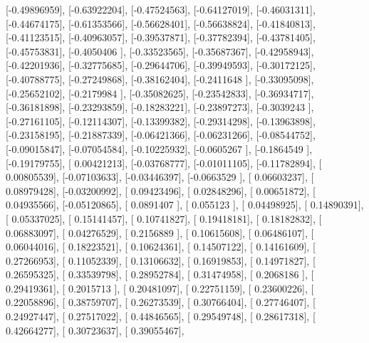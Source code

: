 \documentclass{article}
\begin{document}
       [-0.49896959],
       [-0.63922204],
       [-0.47524563],
       [-0.64127019],
       [-0.46031311],
       [-0.44674175],
       [-0.61353566],
       [-0.56628401],
       [-0.56638824],
       [-0.41840813],
       [-0.41123515],
       [-0.40963057],
       [-0.39537871],
       [-0.37782394],
       [-0.43781405],
       [-0.45753831],
       [-0.4050406 ],
       [-0.33523565],
       [-0.35687367],
       [-0.42958943],
       [-0.42201936],
       [-0.32775685],
       [-0.29644706],
       [-0.39949593],
       [-0.30172125],
       [-0.40788775],
       [-0.27249868],
       [-0.38162404],
       [-0.2411648 ],
       [-0.33095098],
       [-0.25652102],
       [-0.2179984 ],
       [-0.35082625],
       [-0.23542833],
       [-0.36934717],
       [-0.36181898],
       [-0.23293859],
       [-0.18283221],
       [-0.23897273],
       [-0.3039243 ],
       [-0.27161105],
       [-0.12114307],
       [-0.13399382],
       [-0.29314298],
       [-0.13963898],
       [-0.23158195],
       [-0.21887339],
       [-0.06421366],
       [-0.06231266],
       [-0.08544752],
       [-0.09015847],
       [-0.07054584],
       [-0.10225932],
       [-0.0605267 ],
       [-0.1864549 ],
       [-0.19179755],
       [ 0.00421213],
       [-0.03768777],
       [-0.01011105],
       [-0.11782894],
       [ 0.00805539],
       [-0.07103633],
       [-0.03446397],
       [-0.0663529 ],
       [ 0.06603237],
       [ 0.08979428],
       [-0.03200992],
       [ 0.09423496],
       [ 0.02848296],
       [ 0.00651872],
       [ 0.04935566],
       [-0.05120865],
       [ 0.0891407 ],
       [ 0.055123  ],
       [ 0.04498925],
       [ 0.14890391],
       [ 0.05337025],
       [ 0.15141457],
       [ 0.10741827],
       [ 0.19418181],
       [ 0.18182832],
       [ 0.06883097],
       [ 0.04276529],
       [ 0.2156889 ],
       [ 0.10615608],
       [ 0.06486107],
       [ 0.06044016],
       [ 0.18223521],
       [ 0.10624361],
       [ 0.14507122],
       [ 0.14161609],
       [ 0.27266953],
       [ 0.11052339],
       [ 0.13106632],
       [ 0.16919853],
       [ 0.14971827],
       [ 0.26595325],
       [ 0.33539798],
       [ 0.28952784],
       [ 0.31474958],
       [ 0.2068186 ],
       [ 0.29419361],
       [ 0.2015713 ],
       [ 0.20481097],
       [ 0.22751159],
       [ 0.23600226],
       [ 0.22058896],
       [ 0.38759707],
       [ 0.26273539],
       [ 0.30766404],
       [ 0.27746407],
       [ 0.24927447],
       [ 0.27517022],
       [ 0.44846565],
       [ 0.29549748],
       [ 0.28617318],
       [ 0.42664277],
       [ 0.30723637],
       [ 0.39055467],
\end{document}

